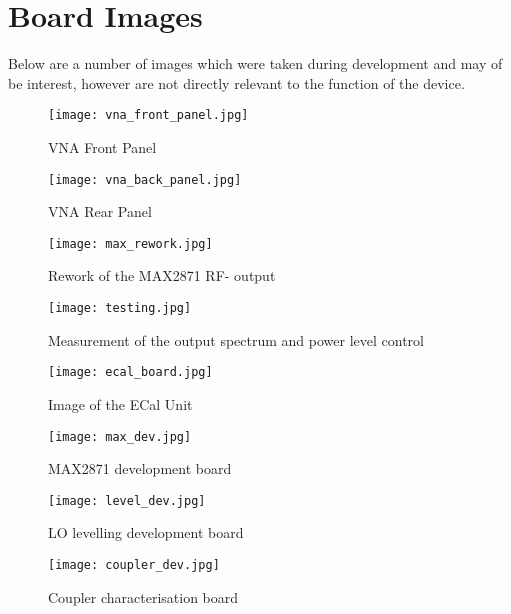 \section{Board Images}
Below are a number of images which were taken during development and may of be interest, however are not directly relevant to the function of the device. 

\begin{figure}[H]
	\centering
	\texttt{[image: vna\_front\_panel.jpg]}
	\caption{VNA Front Panel}
	\label{fig:pcb_front_render}
\end{figure}

\begin{figure}[H]
	\centering
	\texttt{[image: vna\_back\_panel.jpg]}
	\caption{VNA Rear Panel}
	\label{fig:pcb_rear_render}
\end{figure}

\begin{figure}[H]
	\centering
	\texttt{[image: max\_rework.jpg]}
	\caption{Rework of the MAX2871 RF- output}
	\label{fig:max_rework}
\end{figure}


\begin{figure}[H]
	\centering
	\texttt{[image: testing.jpg]}
	\caption{Measurement of the output spectrum and power level control}
	\label{fig:testing_vna}
\end{figure}

\begin{figure}[H]
	\centering
	\texttt{[image: ecal\_board.jpg]}
	\caption{Image of the ECal Unit}
	\label{fig:ecal_photo}
\end{figure}

\begin{figure}[H]
	\centering
	\texttt{[image: max\_dev.jpg]}
	\caption{MAX2871 development board}
	\label{fig:max_dev}
\end{figure}

\begin{figure}[H]
	\centering
	\texttt{[image: level\_dev.jpg]}
	\caption{LO levelling development board}
	\label{fig:level_dev}
\end{figure}

\begin{figure}[H]
	\centering
	\texttt{[image: coupler\_dev.jpg]}
	\caption{Coupler characterisation board}
	\label{fig:coulpler_dev}
\end{figure}
